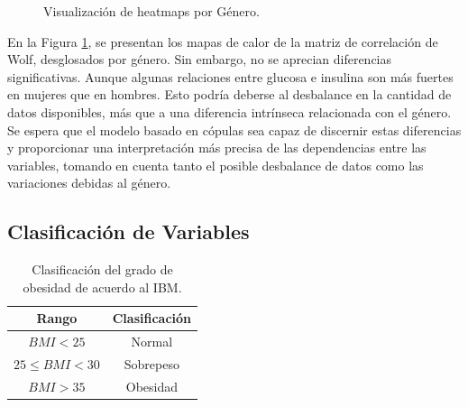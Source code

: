 \begin{figure}[H]
 \centering
    \caption{Visualización de heatmaps por Género.}
    \label{fig:CorWolfGen}
\end{figure}

En la Figura \ref{fig:CorWolfGen}, se presentan los mapas de calor de la matriz de correlación de Wolf, desglosados por género. Sin embargo, no se aprecian diferencias significativas. Aunque algunas relaciones entre glucosa e insulina son más fuertes en mujeres que en hombres. Esto podría deberse al desbalance en la cantidad de datos disponibles, más que a una diferencia intrínseca relacionada con el género. Se espera que el modelo basado en cópulas sea capaz de discernir estas diferencias y proporcionar una interpretación más precisa de las dependencias entre las variables, tomando en cuenta tanto el posible desbalance de datos como las variaciones debidas al género.



 \subsection{Clasificación de Variables}\label{ClasificaVar}

\begin{table}[H]
    \centering
    \begin{tabular}{||c|c||}
    \hline\hline
    \textbf{Rango}                  & \textbf{Clasificación} \\ \hline\hline
    $ BMI < 25$            & Normal                 \\ \hline
    $25\leq BMI<30$                 & Sobrepeso              \\ \hline
    $ BMI > 35$               & Obesidad       \\ \hline\hline
\end{tabular}
\caption{Clasificación del grado de obesidad de acuerdo al IBM.}
\label{tab:clasBMI}
\end{table}

